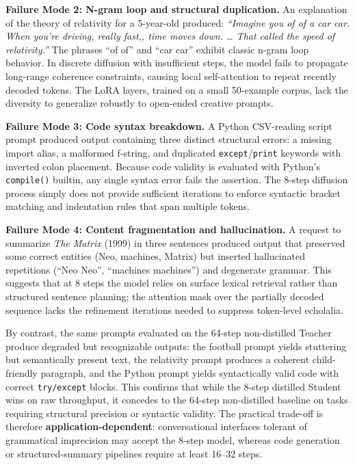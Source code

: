 \documentclass[11pt, a4paper]{article}
\begin{document}
\textbf{Failure Mode 2: N-gram loop and structural duplication.} An explanation of the theory of relativity for a 5-year-old produced: \textit{``Imagine you of of a car car. When you're driving, really fast,, time moves down. \ldots{} That called the speed of relativity.''} The phrases ``of of'' and ``car car'' exhibit classic n-gram loop behavior. In discrete diffusion with insufficient steps, the model fails to propagate long-range coherence constraints, causing local self-attention to repeat recently decoded tokens. The LoRA layers, trained on a small 50-example corpus, lack the diversity to generalize robustly to open-ended creative prompts.

\textbf{Failure Mode 3: Code syntax breakdown.} A Python CSV-reading script prompt produced output containing three distinct structural errors: a missing import alias, a malformed f-string, and duplicated \texttt{except}/\texttt{print} keywords with inverted colon placement. Because code validity is evaluated with Python's \texttt{compile()} builtin, any single syntax error fails the assertion. The 8-step diffusion process simply does not provide sufficient iterations to enforce syntactic bracket matching and indentation rules that span multiple tokens.

\textbf{Failure Mode 4: Content fragmentation and hallucination.} A request to summarize \textit{The Matrix} (1999) in three sentences produced output that preserved some correct entities (Neo, machines, Matrix) but inserted hallucinated repetitions (``Neo Neo'', ``machines machines'') and degenerate grammar. This suggests that at 8 steps the model relies on surface lexical retrieval rather than structured sentence planning; the attention mask over the partially decoded sequence lacks the refinement iterations needed to suppress token-level echolalia.

By contrast, the same prompts evaluated on the 64-step non-distilled Teacher produce degraded but recognizable outputs: the football prompt yields stuttering but semantically present text, the relativity prompt produces a coherent child-friendly paragraph, and the Python prompt yields syntactically valid code with correct \texttt{try/except} blocks. This confirms that while the 8-step distilled Student wins on raw throughput, it concedes to the 64-step non-distilled baseline on tasks requiring structural precision or syntactic validity. The practical trade-off is therefore \textbf{application-dependent}: conversational interfaces tolerant of grammatical imprecision may accept the 8-step model, whereas code generation or structured-summary pipelines require at least 16--32 steps.
\end{document}
